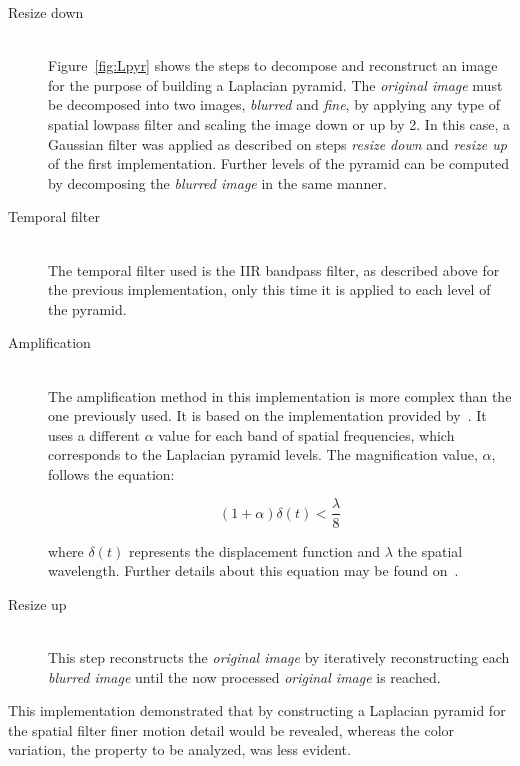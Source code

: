 \begin{description}
  \item[Resize down]\hfill\\
        Figure~\ref{fig:Lpyr} shows the steps to decompose and reconstruct
        an image for the purpose of building a Laplacian pyramid. The
        \emph{original image} must be decomposed into two images,
        \emph{blurred} and \emph{fine}, by applying any type of spatial lowpass
        filter and scaling the image down or up by 2. In this case, a
        Gaussian filter was applied as described on steps \emph{resize down}
        and \emph{resize up} of the first implementation. Further levels of the
        pyramid can be computed by decomposing the \emph{blurred image} in the
        same manner.

  \item[Temporal filter]\hfill\\
        The temporal filter used is the IIR bandpass filter, as described above
        for the previous implementation, only this time it is applied to each
        level of the pyramid.

  \item[Amplification]\hfill\\
        The amplification method in this implementation is more complex than
        the one previously used. It is based on the implementation provided
        by~\cite{Wu2012Eulerian}. It uses a different $\alpha$ value for each
        band of spatial frequencies, which corresponds to the Laplacian pyramid
        levels. The magnification value, $\alpha$, follows the equation:

        \begin{equation}
          (1 + \alpha) \delta(t) < \frac{\lambda}{8}
        \end{equation}

        where $\delta(t)$ represents the displacement function and $\lambda$
        the spatial wavelength. Further details about this equation may be
        found on~\cite[Section 3.2]{Wu2012Eulerian}.

  \item[Resize up]\hfill\\
        This step reconstructs the \emph{original image} by iteratively
        reconstructing each \emph{blurred image} until the now processed
        \emph{original image} is reached.
\end{description}

This implementation demonstrated that by constructing a Laplacian pyramid for
the spatial filter finer motion detail would be revealed, whereas the color
variation, the property to be analyzed, was less evident.

